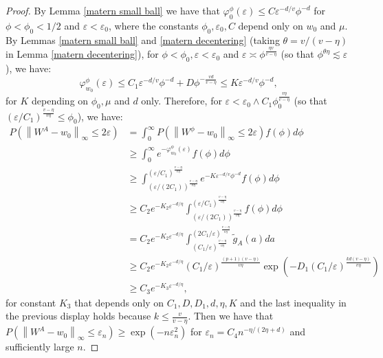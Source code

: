 \documentclass[ejs,noshowframe]{imsart}
\theoremstyle{plain}
\theoremstyle{definition}
\theoremstyle{remark}
\begin{document}
\begin{appendix}
\begin{proof}
By Lemma \ref{matern small ball} we have that $\varphi_0^{\phi}(\varepsilon) \leq C  \varepsilon^{-d/v} \phi^{-d}$ for $\phi<\phi_0<1/2$ and $\varepsilon<\varepsilon_0$, where the constants $\phi_0, \varepsilon_0, C$ depend only on  $w_0$ and $\mu$. By Lemmas \ref{matern small ball} and \ref{matern decentering} (taking $\theta=v/(v-\eta)$ in Lemma \ref{matern decentering}),  for $\phi  <\phi_0, \varepsilon<\varepsilon_0$ and $\varepsilon \asymp \phi^{\frac{\eta v}{v-\eta}}$ (so that $ \phi^{\theta \eta} \lesssim \varepsilon$), we have:
$$
\varphi_{w_0}^\phi(\varepsilon) \leq C_1  \varepsilon^{-d/v} \phi^{-d} +
D \phi^{-\frac{vd}{v-\eta}}
\leq K \varepsilon^{-d/v} \phi^{-d},
$$
for $K$ depending on $\phi_0, \mu$ and $d$ only. Therefore, for $\varepsilon<\varepsilon_0 \wedge C_1 \phi_0^{\frac{v\eta}{v-\eta}}$ (so that $ (\varepsilon/ C_1)^{\frac{v-\eta}{v\eta}} \le \phi_0$), we have:
$$
\begin{aligned}
P\left(\left\|W^A-w_0\right\|_{\infty} \leq 2 \varepsilon\right)&= \int_0^{\infty} P\left(\left\|W^{\phi}-w_0\right\|_{\infty} \leq 2 \varepsilon\right) f({\phi}) d {\phi} \\
& \geq \int_0^{\infty} e^{-\varphi_{w_0}^{\phi}(\varepsilon)} f({\phi}) d {\phi} \\
& \geq \int_{(\varepsilon/(2 C_1))^{\frac{v-\eta}{v\eta}}}^{(  \varepsilon/C_1)^{\frac{v-\eta}{v\eta}}} e^{-K \varepsilon^{-d/v} \phi^{-d}}f({\phi}) d {\phi}  \\
& \geq C_2 e^{-K_2 \varepsilon^{-d/\eta}}  \int_{(\varepsilon/(2 C_1))^{\frac{v-\eta}{v\eta}}}^{(  \varepsilon/C_1)^{\frac{v-\eta}{v\eta}}}f({\phi}) d {\phi}\\
&= C_2 e^{-K_2 \varepsilon^{-d/\eta}}  \int_{(C_1/\varepsilon )^{\frac{v-\eta}{v\eta}}}^{(  2C_1/\varepsilon)^{\frac{v-\eta}{v\eta}}}\tilde{g}_A({a}) d {a}\\
& \ge C_2 e^{-K_2 \varepsilon^{-d/\eta}} (C_1/\varepsilon)^{\frac{(p+1)(v-\eta)}{v\eta}} \exp{(-D_1(C_1/\varepsilon)^{\frac{kd(v-\eta)}{v\eta}})}\\
& \geq C_3 e^{-K_3 \varepsilon^{-d/\eta}},
\end{aligned}
$$
for constant $K_3$ that depends only on $C_1, D, D_1, d, \eta,K$ and the last inequality in the previous display holds because $k \leq \frac{v}{v-\eta}$. Then we have that \\$P\left(\left\|W^A-w_0\right\|_{\infty} \leq \varepsilon_n\right) \geq \exp \left(-n \varepsilon_n^2\right)$ for $\varepsilon_n=C_4 n^{-\eta /(2\eta+d )}$ and sufficiently large $n$.


\end{proof}
\end{appendix}
\end{document}
